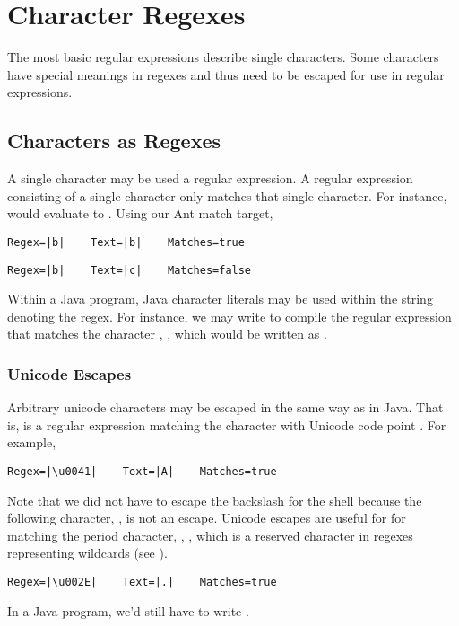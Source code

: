 \section{Character Regexes}

The most basic regular expressions describe single characters.  Some
characters have special meanings in regexes and thus need to be
escaped for use in regular expressions.

\subsection{Characters as Regexes}

A single character may be used a regular expression.  A regular
expression consisting of a single character only matches that single
character.  For instance,
 would evaluate to
.  Using our Ant match target, 
%
\begin{verbatim}
Regex=|b|    Text=|b|    Matches=true
\end{verbatim}
%
\begin{verbatim}
Regex=|b|    Text=|c|    Matches=false
\end{verbatim}
%
Within a Java program, Java character literals may be used within the
string denoting the regex.  For instance, we may write
 to compile the regular expression
that matches the character , , which would be written as .

\subsubsection{Unicode Escapes}

Arbitrary unicode characters may be escaped in the same way as in
Java.  That is,  is a regular expression
matching the character with Unicode code point
.  For example,
%
%
\begin{verbatim}
Regex=|\u0041|    Text=|A|    Matches=true
\end{verbatim}
%
Note that we did not have to escape the backslash for the shell
because the following character, , is not an escape.  Unicode
escapes are useful for for matching the period character,
, , which is a reserved character
in regexes representing wildcards (see ).
%
%
\begin{verbatim}
Regex=|\u002E|    Text=|.|    Matches=true
\end{verbatim}
%
In a Java program, we'd still have to write
.  

